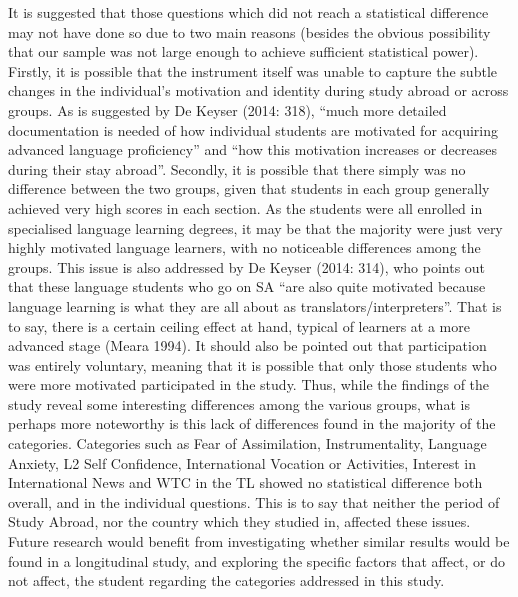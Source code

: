 \documentclass[12pt]{article}
\newenvironment{styleStandard}{\setlength\leftskip{0cm}\setlength\rightskip{0cm plus 1fil}\setlength\parindent{0cm}\setlength\parfillskip{0pt plus 1fil}\setlength\parskip{0in plus 1pt}\writerlistparindent\writerlistleftskip\leavevmode\normalfont\normalsize\writerlistlabel\ignorespaces}{\unskip\vspace{0.111in plus 0.0111in}\par}
\newcommand\writerlistleftskip{}
\newcommand\writerlistparindent{}
\newcommand\writerlistlabel{}
\begin{document}
\begin{styleStandard}
It is suggested that those questions which did not reach a statistical difference may not have done so due to two main reasons (besides the obvious possibility that our sample was not large enough to achieve sufficient statistical power). Firstly, it is possible that the instrument itself was unable to capture the subtle changes in the individual’s motivation and identity during study abroad or across groups. As is suggested by De Keyser (2014: 318), “much more detailed documentation is needed of how individual students are motivated for acquiring advanced language proficiency” and “how this motivation increases or decreases during their stay abroad”. Secondly, it is possible that there simply was no difference between the two groups, given that students in each group generally achieved very high scores in each section. As the students were all enrolled in specialised language learning degrees, it may be that the majority were just very highly motivated language learners, with no noticeable differences among the groups. This issue is also addressed by De Keyser (2014: 314), who points out that these language students who go on SA “are also quite motivated because language learning is what they are all about as translators/interpreters”. That is to say, there is a certain ceiling effect at hand, typical of learners at a more advanced stage (Meara 1994). It should also be pointed out that participation was entirely voluntary, meaning that it is possible that only those students who were more motivated participated in the study. Thus, while the findings of the study reveal some interesting differences among the various groups, what is perhaps more noteworthy is this lack of differences found in the majority of the categories. Categories such as Fear of Assimilation, Instrumentality, Language Anxiety, L2 Self Confidence, International Vocation or Activities, Interest in International News and WTC in the TL showed no statistical difference both overall, and in the individual questions. This is to say that neither the period of Study Abroad, nor the country which they studied in, affected these issues. Future research would benefit from investigating whether similar results would be found in a longitudinal study, and exploring the specific factors that affect, or do not affect, the student regarding the categories addressed in this study. 
\end{styleStandard}
\end{document}
